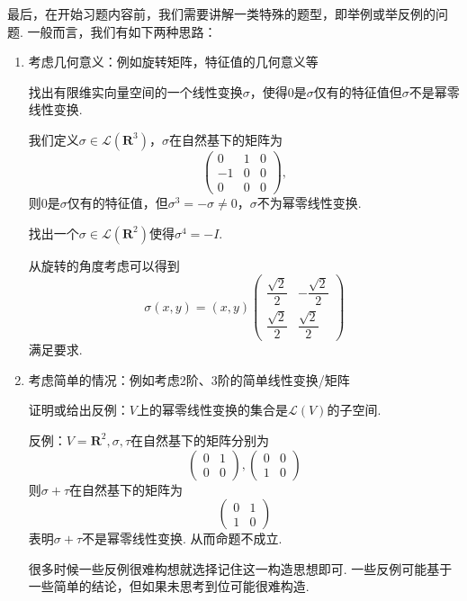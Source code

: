 最后，在开始习题内容前，我们需要讲解一类特殊的题型，即举例或举反例的问题. 一般而言，我们有如下两种思路：
\begin{enumerate}
    \item 考虑几何意义：例如旋转矩阵，特征值的几何意义等
        \begin{example}{}{}
              找出有限维实向量空间的一个线性变换$\sigma$，使得0是$\sigma$仅有的特征值但$\sigma$不是幂零线性变换.
        \end{example}
        \begin{solution}
            我们定义$\sigma\in\mathcal{L}({\mathbf{R}^3})$，$\sigma$在自然基下的矩阵为
            \[\begin{pmatrix}
                0 & 1 & 0 \\
                -1 & 0 & 0 \\
                0 & 0 & 0
            \end{pmatrix},\]
            则$0$是$\sigma$仅有的特征值，但$\sigma^3=-\sigma\neq 0$，$\sigma$不为幂零线性变换.
        \end{solution}
        \begin{example}{}{}
            找出一个$\sigma\in \mathcal{L}(\mathbf{R}^2)$使得$\sigma^4=-I$.
        \end{example}
        \begin{solution}
            从旋转的角度考虑可以得到
            \[
            \sigma(x,y)=(x,y)\begin{pmatrix}
                \dfrac{\sqrt{2}}{2} & -\dfrac{\sqrt{2}}{2} \\[1ex]
                \dfrac{\sqrt{2}}{2} & \dfrac{\sqrt{2}}{2}
            \end{pmatrix}
            \]
            满足要求.
        \end{solution}
    \item 考虑简单的情况：例如考虑2阶、3阶的简单线性变换/矩阵
          \begin{example}{}{}
              证明或给出反例：$V$上的幂零线性变换的集合是$\mathcal{L}(V)$的子空间.
          \end{example}
          \begin{solution}
            反例：$V=\mathbf{R}^2,\sigma,\tau$在自然基下的矩阵分别为
            \[ \begin{pmatrix}
                0 & 1 \\
                0 & 0
            \end{pmatrix},
            \begin{pmatrix}
                0 & 0 \\
                1 & 0
            \end{pmatrix}\]
            则$\sigma+\tau$在自然基下的矩阵为
            \[ \begin{pmatrix}
                0 & 1 \\
                1 & 0
            \end{pmatrix} \]
            表明$\sigma+\tau$不是幂零线性变换. 从而命题不成立.
          \end{solution}
          很多时候一些反例很难构想就选择记住这一构造思想即可. 一些反例可能基于一些简单的结论，但如果未思考到位可能很难构造.
\end{enumerate}

